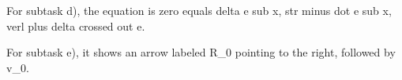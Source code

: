 For subtask d), the equation is zero equals delta e sub x, str minus dot e sub x, verl plus delta crossed out e.

For subtask e), it shows an arrow labeled R_0 pointing to the right, followed by v_0.